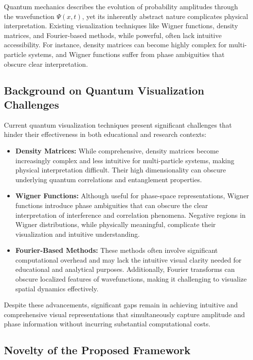 \documentclass[12pt]{article}
\begin{document}
Quantum mechanics describes the evolution of probability amplitudes through the wavefunction \(\Psi(x,t)\), yet its inherently abstract nature complicates physical interpretation. Existing visualization techniques like Wigner functions, density matrices, and Fourier-based methods, while powerful, often lack intuitive accessibility. For instance, density matrices can become highly complex for multi-particle systems, and Wigner functions suffer from phase ambiguities that obscure clear interpretation.


\subsection{Background on Quantum Visualization Challenges}

Current quantum visualization techniques present significant challenges that hinder their effectiveness in both educational and research contexts:
\begin{itemize}
    \item \textbf{Density Matrices:} While comprehensive, density matrices become increasingly complex and less intuitive for multi-particle systems, making physical interpretation difficult. Their high dimensionality can obscure underlying quantum correlations and entanglement properties.
    \item \textbf{Wigner Functions:} Although useful for phase-space representations, Wigner functions introduce phase ambiguities that can obscure the clear interpretation of interference and correlation phenomena. Negative regions in Wigner distributions, while physically meaningful, complicate their visualization and intuitive understanding.
    \item \textbf{Fourier-Based Methods:} These methods often involve significant computational overhead and may lack the intuitive visual clarity needed for educational and analytical purposes. Additionally, Fourier transforms can obscure localized features of wavefunctions, making it challenging to visualize spatial dynamics effectively.
\end{itemize}

Despite these advancements, significant gaps remain in achieving intuitive and comprehensive visual representations that simultaneously capture amplitude and phase information without incurring substantial computational costs.

\subsection{Novelty of the Proposed Framework}
\end{document}
